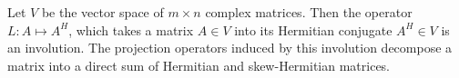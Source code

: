 \documentclass[12pt]{article}
\begin{document}
Let $V$ be the vector space of $m\times n$ complex matrices.  Then the operator $L\colon A \mapsto A^H$, which takes a matrix $A\in V$ into its Hermitian conjugate $A^H \in V$ is an involution.  The projection operators induced by this involution decompose a matrix into a direct sum of Hermitian and skew-Hermitian matrices.
\end{document}
